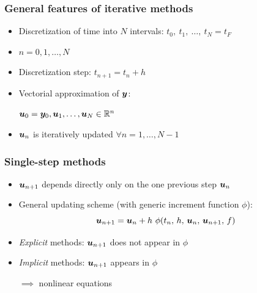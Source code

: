 \documentclass{beamer}
\begin{document}
\begin{frame} %
	\frametitle{General features of iterative methods}
	\begin{itemize}
		\item Discretization of time into $N$ intervals: $t_0, \ t_1, \ \dots, \ t_{N} = t_F$
		\item $n = 0, 1, \dots, N$
		\item Discretization step: $t_{n+1} = t_n + h$
		\pause
		\item Vectorial approximation of $\boldsymbol y$:
		\begin{center}
			$\boldsymbol u_0 = \boldsymbol y_0, \boldsymbol u_1, \dots, \boldsymbol u_{N} \in \mathbb R^n$
		\end{center}
		\item $\boldsymbol u_n$ is iteratively updated $\forall n = 1, \dots, N-1$
	\end{itemize}
\end{frame}

\begin{frame}
	\frametitle{Single-step methods} %
	\begin{itemize}
		\item $\boldsymbol u_{n+1}$ depends directly only on the one previous step $\boldsymbol u_{n}$
		\item General updating scheme (with generic increment function $\phi$):
		$$ \boldsymbol u_{n+1} = \boldsymbol u_{n} + h \ \phi(t_n, \, h, \, \boldsymbol u_n, \, \boldsymbol u_{n+1}, \, f) $$
		\pause
		\item \textit{Explicit} methods: $\boldsymbol u_{n+1}$ does not appear in $\phi$
		\item \textit{Implicit} methods: $\boldsymbol u_{n+1}$ appears in $\phi$
		\begin{center}
			\vspace{-5pt}
			$\implies$ nonlinear equations
		\end{center}
	\end{itemize}
\end{frame}
\end{document}
